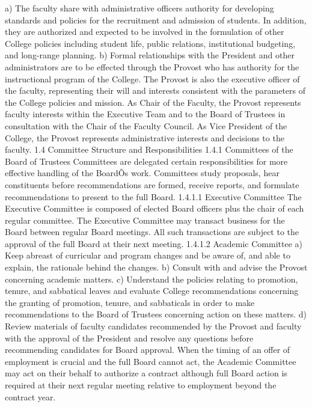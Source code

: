 \documentclass[letterpaper, 11pt]{article}
\begin{document}
			a) The faculty share with administrative officers authority for developing standards and policies for the recruitment and admission of students. In addition, they are authorized and expected to be involved in the formulation of other College policies including student life, public relations, institutional budgeting, and long-range planning.
			b) Formal relationships with the President and other administrators are to be effected through the Provost who has authority for the instructional program of the College.  The Provost is also the executive officer of the faculty, representing their will and interests consistent with the parameters of the College policies and mission.  As Chair of the Faculty, the Provost represents faculty interests within the Executive Team and to the Board of Trustees in consultation with the Chair of the Faculty Council.  As Vice President of the College, the Provost represents administrative interests and decisions to the faculty.
			1.4 Committee Structure and Responsibilities
			1.4.1 Committees of the Board of Trustees
			Committees are delegated certain responsibilities for more effective handling of the BoardÕs work.  Committees study proposals, hear constituents before recommendations are formed, receive reports, and formulate recommendations to present to the full Board.
			1.4.1.1 Executive Committee
			The Executive Committee is composed of elected Board officers plus the chair of each regular committee.  The Executive Committee may transact business for the Board between regular Board meetings.  All such transactions are subject to the approval of the full Board at their next meeting.
			1.4.1.2 Academic Committee
			a) Keep abreast of curricular and program changes and be aware of, and able to explain, the rationale behind the changes.
			b) Consult with and advise the Provost concerning academic matters.
			c) Understand the policies relating to promotion, tenure, and sabbatical leaves and evaluate College recommendations concerning the granting of promotion, tenure, and sabbaticals in order to make recommendations to the Board of Trustees concerning action on these matters.
			d) Review materials of faculty candidates recommended by the Provost and faculty with the approval of the President and resolve any questions before recommending candidates for Board approval.  When the timing of an offer of employment is crucial and the full Board cannot act, the Academic Committee may act on their behalf to authorize a contract although full Board action is required at their next regular meeting relative to employment beyond the contract year.
\end{document}
